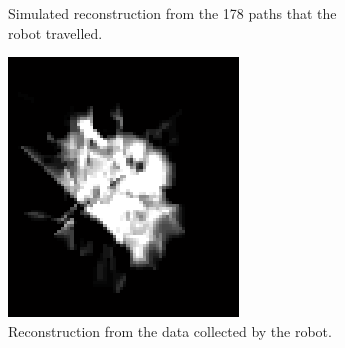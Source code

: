 \documentclass[english]{article}\usepackage[]{graphicx}\usepackage[]{color}
\begin{document}
\begin{figure}[h]
\begin{subfigure}{.22\textwidth}
  \caption{Simulated reconstruction from the 178 paths that the robot travelled.}
  \vspace{0pt}
  \label{fig:experressim}
\end{subfigure}%
\hspace{10pt}
\begin{subfigure}{.22\textwidth}
  \centering
    \includegraphics[width=1\linewidth]{figures/experimentalresultrec}
  \caption{Reconstruction from the data collected by the robot.}
  \vspace{10pt}
  \label{fig:experresrec}
\end{subfigure}%
\hspace {10pt}
\begin{subfigure}{.22\textwidth}
  \centering

\end{subfigure}
\end{figure}
\end{document}
